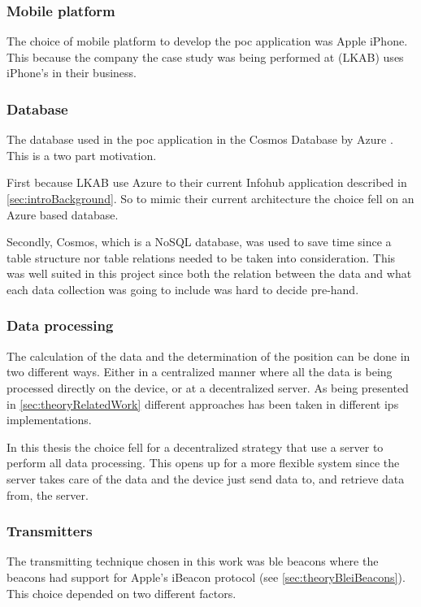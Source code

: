 \subsubsection{Mobile platform}\label{sec:methodSoftwareDesignMobilePlatform}
The choice of mobile platform to develop the \acrfull{poc} application was Apple iPhone.
This because the company the case study was being performed at (LKAB) uses iPhone's in their business.


\subsubsection{Database}\label{sec:methodSoftwareDesignDatabase}
The database used in the \acrshort{poc} application in the Cosmos Database by Azure \cite{IntroductionAzureCosmos}.
This is a two part motivation.

\bigskip

First because LKAB use Azure to their current Infohub application described in \cref{sec:introBackground}.
So to mimic their current architecture the choice fell on an Azure based database.

\bigskip

Secondly, Cosmos, which is a NoSQL database, was used to save time since a table structure nor table relations needed to be taken into consideration.
This was well suited in this project since both the relation between the data and what each data collection was going to include was hard to decide pre-hand.


\subsubsection{Data processing}\label{sec:methodSoftwareDesignData}
The calculation of the data and the determination of the position can be done in two different ways.
Either in a centralized manner where all the data is being processed directly on the device, or at a decentralized server.
As being presented in \cref{sec:theoryRelatedWork} different approaches has been taken in different \acrshort{ips} implementations.

\bigskip

In this thesis the choice fell for a decentralized strategy that use a server to perform all data processing.
This opens up for a more flexible system since the server takes care of the data and the device just send data to, and retrieve data from, the server.


\subsubsection{Transmitters}\label{sec:methodSoftwareDesignTransmitters}
The transmitting technique chosen in this work was \acrfull{ble} beacons where the beacons had support for Apple's iBeacon protocol (see \cref{sec:theoryBleiBeacons}).
This choice depended on two different factors.

